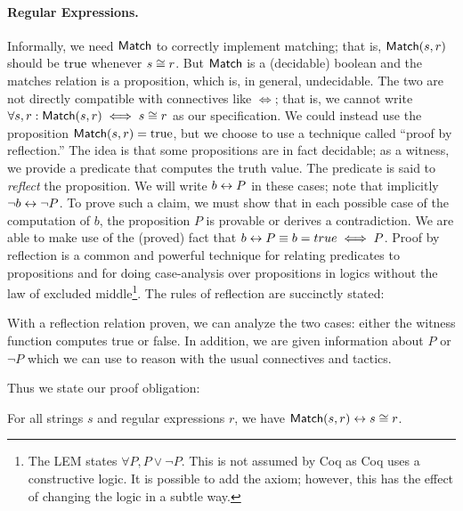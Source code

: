 \paragraph{Regular Expressions.} Informally, we need \(\mathsf{Match}\) to
correctly implement matching; that is, \(\mathsf{Match}(s, r)\) should be
\(\operatorname{true}\) whenever \(s \mathrel{\cong} r\). But \(\mathsf{Match}\) is a (decidable)
boolean and the matches relation is a proposition, which is, in general,
undecidable. The two are not directly compatible with connectives like \(\iff\);
that is, we cannot write \(\forall s, r: \mathsf{Match}(s, r) \iff s \mathrel{\cong} r\)
as our specification. We could instead use the proposition \(\mathsf{Match}(s, r) =
\operatorname{true}\), but we choose to use a technique called ``proof by reflection.'' The
idea is that some propositions are in fact decidable; as a witness, we provide a
predicate that computes the truth value. The predicate is said to \emph{reflect}
the proposition. We will write \(b \mathrel{\leftrightarrow} P\) in these cases; note that
implicitly \(\neg b \mathrel{\leftrightarrow} \neg P\). To prove such a claim, we must show that
in each possible case of the computation of \(b\), the proposition \(P\) is
provable or derives a contradiction. We are able to make use of the (proved)
fact that \(b \mathrel{\leftrightarrow} P \equiv b = true \iff P\). Proof by reflection is a
common and powerful technique for relating predicates to propositions and for
doing case-analysis over propositions in logics without the law of excluded
middle\footnote{The LEM states \(\forall P, P \lor \neg P\). This is not assumed
by Coq as Coq uses a constructive logic. It is possible to add the axiom;
however, this has the effect of changing the logic in a subtle way.}. The rules
of reflection are succinctly stated:
With a reflection relation proven, we can analyze the two cases: either the
witness function computes true or false. In addition, we are given information
about \(P\) or \(\neg P\) which we can use to reason with the usual connectives
and tactics.

Thus we state our proof obligation:
\begin{thm}\label{Th:r_match}
    For all strings \(s\) and regular expressions \(r\), we have
    \(\mathsf{Match}(s, r) \mathrel{\leftrightarrow} s \mathrel{\cong} r\).
\end{thm}

